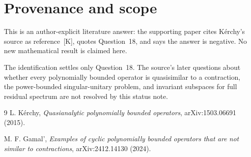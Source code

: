 \documentclass[11pt]{article}
\begin{document}
\section{Provenance and scope}

This is an author-explicit literature answer: the supporting paper cites
K\'erchy's source as reference~[K], quotes Question~18, and says the answer is
negative.  No new mathematical result is claimed here.

The identification settles only Question~18.  The source's later questions
about whether every polynomially bounded operator is quasisimilar to a
contraction, the power-bounded singular-unitary problem, and invariant
subspaces for full residual spectrum are not resolved by this status note.

\begin{thebibliography}{9}
L. K\'erchy,
\emph{Quasianalytic polynomially bounded operators},
arXiv:1503.06691 (2015).

M. F. Gamal',
\emph{Examples of cyclic polynomially bounded operators that are not similar
to contractions},
arXiv:2412.14130 (2024).
\end{thebibliography}
\end{document}
